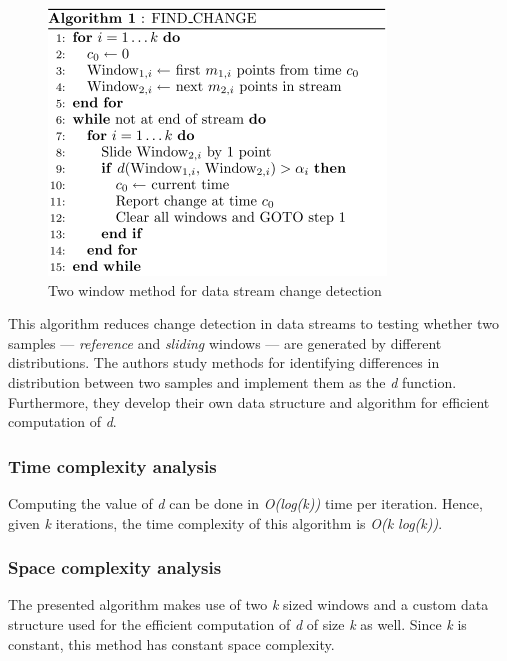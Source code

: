 \begin{figure}[!htb]
    \begin{center}
      \includegraphics[scale=0.8]{figures/2-windows-change-pseudocode.png}
      \caption{Two window method for data stream change detection}
      \label{fig:change-detection-2-windows}
    \end{center}
\end{figure}

This algorithm reduces change detection in data streams to testing whether two samples --- \textit{reference} and \textit{sliding} windows --- are generated by different distributions. The authors study methods for identifying differences in distribution between two samples and implement them as the \textit{d} function. Furthermore, they develop their own data structure and algorithm for efficient computation of \textit{d}.


\subsubsection*{Time complexity analysis}
Computing the value of \textit{d} can be done in \textit{O(log(k))} time per iteration. Hence, given \textit{k} iterations, the time complexity of this algorithm is \textit{O(k log(k))}.

\subsubsection*{Space complexity analysis}
The presented algorithm makes use of two \textit{k} sized windows and a custom data structure used for the efficient computation of \textit{d} of size \textit{k} as well. Since \textit{k} is constant, this method has constant space complexity.

